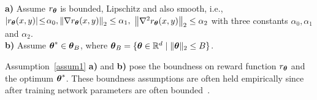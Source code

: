 \begin{assumption}
	\label{assum1}
  \textbf{a)}  Assume $r_{{\boldsymbol{\theta}}}$ is bounded, Lipschitz and also smooth, i.e., $ |r_{{\boldsymbol{\theta}}}(x,y)| \!\leq\!\alpha_{0},   \left\|\nabla r_{{\boldsymbol{\theta}}}(x,y)\right\|_{2}\leq\alpha_{1}, $  $ \left\|\nabla^{2} r_{{\boldsymbol{\theta}}}(x,y)\right\|_{2}\leq\alpha_{2}$ with  three   constants $\alpha_{0}, \alpha_{1}$ and $\alpha_{2}$. \\ 
  \textbf{b)}  Assume $\boldsymbol{\theta}^{*}\in{\boldsymbol{\theta}}_{B}$, where ${\boldsymbol{\theta}}_{B}=\{{\boldsymbol{\theta}}\in\mathbb{R}^{d}\mid\|{\boldsymbol{\theta}}\|_{2}\leq B\}$.
\end{assumption}
\vspace{-4pt}
Assumption~\ref{assum1} \textbf{a)} and \textbf{b)} pose the boundness on reward function $r_{{\boldsymbol{\theta}}}$ and the  optimum  $\boldsymbol{\theta}^{*}$. These boundness assumptions are often held empirically since after training network parameters are often bounded~\cite{principled}. 


